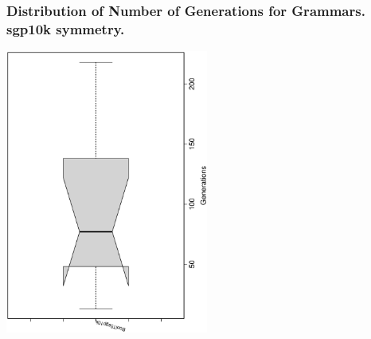  \begin{frame}
 \frametitle{ Distribution of Number of Generations for Grammars. sgp10k  symmetry. }
 \begin{center}
\includegraphics[width=0.5\textwidth, angle=-90]
{ExpFboxplottGenerations008.eps}
 \end{center}
 \label{ExpFboxplottGenerations008.eps}  
 \end{frame}

